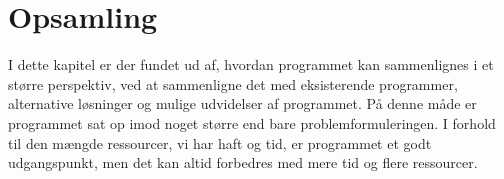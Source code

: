 \section*{Opsamling}
I dette kapitel er der fundet ud af, hvordan programmet kan sammenlignes i et større perspektiv, ved at sammenligne det med eksisterende programmer, alternative løsninger og mulige udvidelser af programmet. På denne måde er programmet sat op imod noget større end bare problemformuleringen. I forhold til den mængde ressourcer, vi har haft og tid, er programmet et godt udgangspunkt, men det kan altid forbedres med mere tid og flere ressourcer. 